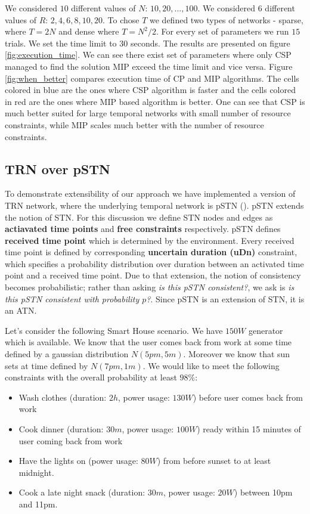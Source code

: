 \documentclass{article}
\begin{document}
\begin{multicols}{2}
We considered $10$ different values of $N$: $10, 20, ..., 100$. We considered $6$ different values of $R$: $2, 4, 6, 8, 10, 20$. To chose $T$ we defined two types of networks - sparse, where $T = 2N$ and dense where $T = N^2/2$. For every set of parameters we run $15$ trials. We set the time limit to $30$ seconds. The results are presented on figure \ref{fig:execution_time}. We can see there exist set of parameters where only CSP managed to find the solution MIP exceed the time limit and vice versa. Figure \ref{fig:when_better} compares execution time of CP and MIP algorithms. The cells colored in blue are the ones where CSP algorithm is faster and the cells colored in red are the ones where MIP based algorithm is better. One can see that CSP is much better suited for large temporal networks with small number of resource constraints, while MIP scales much better with the number of resource constraints.




\subsection{TRN over pSTN}
To demonstrate extensibility of our approach we have implemented a version of TRN network, where the underlying temporal network is pSTN (\cite{Fang2014}). pSTN extends the notion of STN. For this discussion we define STN nodes and edges as \textbf{actiavated time points} and \textbf{free constraints} respectively. pSTN defines \textbf{received time point} which is determined by the environment. Every received time point is defined by corresponding \textbf{uncertain duration (uDn)} constraint, which specifies a probability distribution over duration between an activated time point and a received time point. Due to that extension, the notion of consistency becomes probabilistic; rather than asking \textit{is this pSTN consistent?}, we ask is \textit{is this pSTN consistent with probability $p$?}. Since pSTN is an extension of STN, it is an ATN.

Let's consider the following Smart House scenario. We have $150W$ generator which is available. We know that the user comes back from work at some time defined by a gaussian distribution $N(5pm, 5m)$. Moreover we know that sun sets at time defined by $N(7pm, 1m)$. We would like to meet the following constraints with the overall probability at least $98\%$:
\begin{itemize}
\item Wash clothes (duration: $2h$, power usage: $130W$) before user comes back from work
\item Cook dinner (duration: $30m$, power usage: $100W$) ready within 15 minutes of user coming back from work
\item Have the lights on (power usage: $80W$) from before sunset to at least midnight.
\item Cook a late night snack (duration: $30m$, power usage: $20W$) between 10pm and 11pm.
\end{itemize}



\end{multicols}
\end{document}
